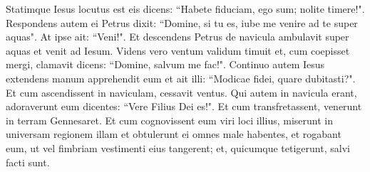 \begin{biblechapter}
\verse Statimque Iesus locutus est eis dicens: “Habete fiduciam, ego sum; nolite timere!".  
\verse Respondens autem ei Petrus dixit: “Domine, si tu es, iube me venire ad te super aquas". 
\verse At ipse ait: “Veni!". Et descendens Petrus de navicula ambulavit super aquas et venit ad Iesum. 
\verse Videns vero ventum validum timuit et, cum coepisset mergi, clamavit dicens: “Domine, salvum me fac!".  
\verse Continuo autem Iesus extendens manum apprehendit eum et ait illi: “Modicae fidei, quare dubitasti?". 
\verse Et cum ascendissent in naviculam, cessavit ventus. 
\verse Qui autem in navicula erant, adoraverunt eum dicentes: “Vere Filius Dei es!". 
\verse Et cum transfretassent, venerunt in terram Gennesaret. 
\verse Et cum cognovissent eum viri loci illius, miserunt in universam regionem illam et obtulerunt ei omnes male habentes, 
\verse et rogabant eum, ut vel fimbriam vestimenti eius tangerent; et, quicumque tetigerunt, salvi facti sunt. 
\end{biblechapter}

